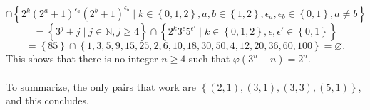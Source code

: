 \begin{solution}
\[    \]
    \[
        \cap \left\{2^k \left(2^a + 1\right)^{\epsilon_a} \left(2^b + 1\right)^{\epsilon_b} \mid k \in \left\{0,1,2\right\}, a,b \in \left\{1,2\right\}, \epsilon_a, \epsilon_b \in \left\{0,1\right\}, a \neq b \right\}
    \]
    \[
        = \left\{3^j + j \mid j \in \mathbb{N}, j \geq 4\right\} \cap \left\{2^k 3^{\epsilon} 5^{\epsilon'} \mid k \in \left\{0,1,2\right\}, \epsilon, \epsilon' \in \left\{0,1\right\} \right\}
    \]
    \[
        = \left\{85\right\} \cap \left\{1, 3, 5, 9, 15, 25, 2, 6, 10, 18, 30, 50, 4, 12, 20, 36, 60, 100\right\} = \varnothing.
    \]
    This shows that there is no integer \( n \geq 4 \) such that \( \varphi\left(3^n + n\right) = 2^n \).
    \\\\
    To summarize, the only pairs that work are \( \left\{\left(2,1\right), \left(3,1\right), \left(3,3\right), \left(5,1\right)\right\} \), and this concludes.
\end{solution}

